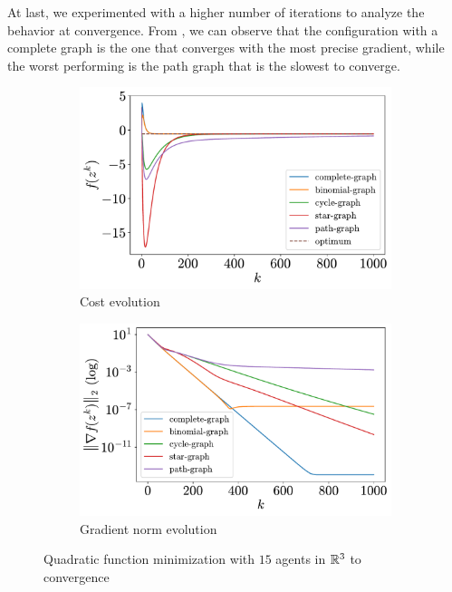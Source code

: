 \documentclass[a4paper,11pt,oneside]{book}
\begin{document}
At last, we experimented with a higher number of iterations to analyze the behavior at convergence. From , we can observe that the configuration with a complete graph is the one that converges with the most precise gradient, while the worst performing is the path graph that is the slowest to converge.

\begin{figure}[htb!]
      \centering
      \begin{subfigure}[t]{0.46\linewidth}
            \centering
            \includegraphics[width=\linewidth]{./figs/quadratic/15_3_1000/cost.pdf} 
            \caption{Cost evolution}
      \end{subfigure}
      \hfill
      \begin{subfigure}[t]{0.46\linewidth}
            \centering
            \includegraphics[width=\linewidth]{./figs/quadratic/15_3_1000/gradient.pdf} 
            \caption{Gradient norm evolution}
      \end{subfigure}
      \caption{Quadratic function minimization with $15$ agents in ${\mathbb{R}}^{3}$ to convergence}
      \label{fig:quadratic_15_3_1000}
\end{figure}
\end{document}
